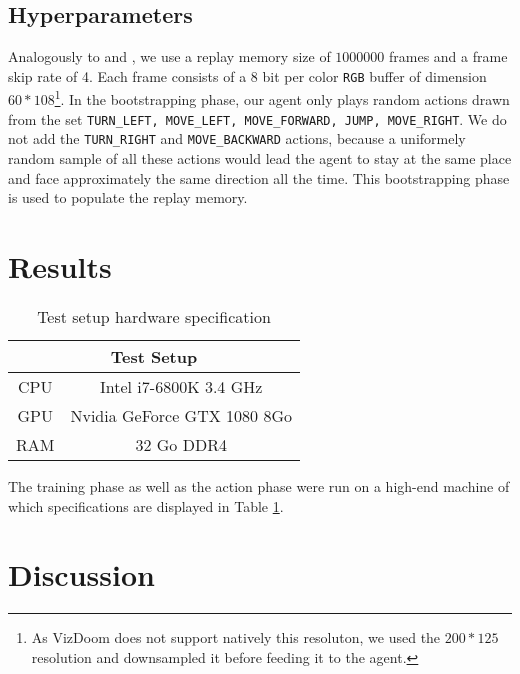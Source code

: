 \documentclass[letterpaper]{article}
\newcommand\Tstrut{\rule{0pt}{2.6ex}}
\begin{document}
\subsection{Hyperparameters}
Analogously to \cite{Mnih2015} and \cite{Lample2016}, we use a replay memory size of $1000000$ frames and a frame skip rate of 4.
Each frame consists of a 8 bit per color \texttt{RGB} buffer of dimension $60 * 108$\footnote{As VizDoom does not support natively this resoluton, we used the $200 * 125$ resolution and downsampled it before feeding it to the agent.}.
In the bootstrapping phase, our agent only plays random actions drawn from the set \texttt{TURN\_LEFT, MOVE\_LEFT, MOVE\_FORWARD, JUMP, MOVE\_RIGHT}. We do not add the \texttt{TURN\_RIGHT} and \texttt{MOVE\_BACKWARD} actions, because a uniformely random sample of all these actions would lead the agent to stay at the same place and face approximately the same direction all the time. This bootstrapping phase is used to populate the replay memory.

\section{Results}
\begin{table}[h]
\centering
\begin{tabular}{cc}
\multicolumn{2}{c}{Test Setup}                         \Tstrut\\ \hline
\multicolumn{1}{c|}{CPU} & Intel i7-6800K 3.4 GHz      \Tstrut\\
\multicolumn{1}{c|}{GPU} & Nvidia GeForce GTX 1080 8Go \Tstrut\\
\multicolumn{1}{c|}{RAM} & 32 Go DDR4                      \Tstrut
\end{tabular}
\caption{Test setup hardware specification}
\label{tab:specs}
\end{table}

The training phase as well as the action phase were run on a high-end machine of which specifications are displayed in Table \ref{tab:specs}.

\section{Discussion}


\footnotesize


\end{document}

